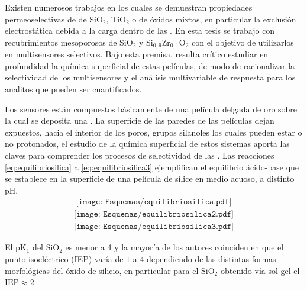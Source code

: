 	Existen numerosos trabajos en los cuales se demuestran propiedades permeoselectivas de \pdm\space de SiO$_2$, TiO$_2$ o de óxidos mixtos, en particular la exclusión electrostática debida a la carga dentro de las \pdm. \cite{walcarius2013,Andrieu-Brunsen2015,Etienne2013,Calvo2009,brunsen2011} En esta tesis se trabajo con recubrimientos mesoporosos de SiO$_2$ y Si$_{0,9}$Zr$_{0,1}$O$_2$ con el objetivo de utilizarlos en multisensores selectivos. Bajo esta premisa, resulta crítico estudiar en profundidad la química superficial de estas películas, de modo de racionalizar la selectividad de los multisensores y el análisis multivariable de respuesta para los analitos que pueden ser cuantificados. 

	Los sensores están compuestos básicamente de una película delgada de oro sobre la cual se deposita una \pdm. La superficie de las paredes de las películas dejan expuestos, hacia el interior de los poros, grupos silanoles los cuales pueden estar o no protonados, el estudio de la química superficial de estos sistemas aporta las claves para comprender los procesos de selectividad de las \pdm.\cite{Brinker1990,Soler-Illia2011} Las reacciones \ref{eq:equilibriosilica} a \ref{eq:equilibriosilica3} ejemplifican el equilibrio ácido-base que se establece en la superficie de una película de sílice en medio acuoso, a distinto pH.\cite{Lowe2015} 
			\begin{equation}
				\begin{aligned}
				\texttt{[image: Esquemas/equilibriosilica.pdf]}
				\label{eq:equilibriosilica}
				\end{aligned}
				\end{equation}
			\begin{equation}
				\begin{aligned}
				\texttt{[image: Esquemas/equilibriosilica2.pdf]}
				\end{aligned}
				\label{eq:equilibriosilica2}
				\end{equation}
			\begin{equation}
				\begin{aligned}
				\texttt{[image: Esquemas/equilibriosilica3.pdf]}
				\label{eq:equilibriosilica3}
				\end{aligned}
				\end{equation}		
     
     El pK$_{1}$ del $\text{SiO}_2$ es menor a 4 y la mayoría de los autores coinciden en que el punto isoeléctrico (IEP) varía de $1$ a $4$ dependiendo de  las distintas formas morfológicas del óxido de silicio, en particular para el SiO$_2$ obtenido vía sol-gel el $\text{IEP}\approx 2$ \cite{Kosmulski2002,Kosmulski2014,Schwarz1984,Si-HanWu2013}.
     
